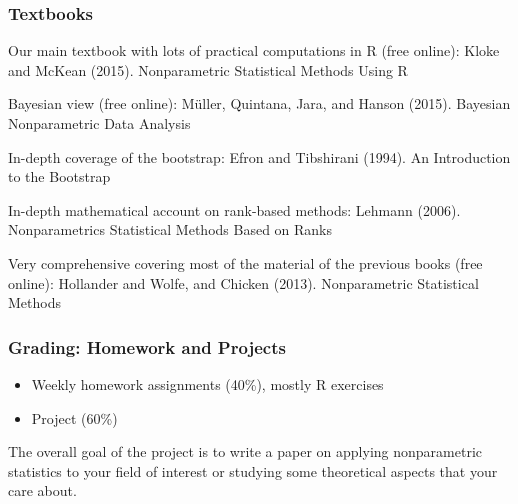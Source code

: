 \documentclass[10pt]{beamer}
\begin{document}
\begin{frame}
\frametitle{Textbooks}

Our main textbook with lots of practical computations in R (free online): \newline
Kloke and McKean (2015). Nonparametric Statistical Methods Using R \newline

Bayesian view (free online): \newline
M\"uller, Quintana, Jara, and Hanson (2015). Bayesian Nonparametric Data Analysis \newline

In-depth coverage of the bootstrap: \newline
Efron and Tibshirani (1994). An Introduction to the Bootstrap  \newline

In-depth mathematical account on rank-based methods: \newline
Lehmann (2006). Nonparametrics Statistical Methods Based on Ranks \newline

Very comprehensive covering most of the material of the previous books (free online): \newline
Hollander and Wolfe, and Chicken (2013). Nonparametric Statistical Methods \newline

\end{frame}

\begin{frame}
\frametitle{Grading: Homework and Projects}

\begin{itemize}
\item Weekly homework assignments (40\%), mostly R exercises
\item Project (60\%)
\end{itemize}

The overall goal of the project is to write a paper on applying nonparametric statistics to your field of interest or studying some theoretical aspects that your care about.

\end{frame}
\end{document}
